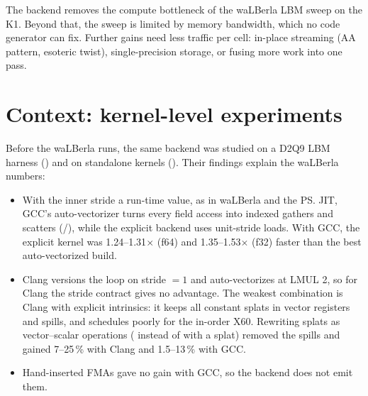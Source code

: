 \begin{keyidea}
  The backend removes the compute bottleneck of the waLBerla LBM sweep on the K1. Beyond
  that, the sweep is limited by memory bandwidth, which no code generator can fix.
  Further gains need less traffic per cell: in-place streaming (AA pattern, esoteric
  twist), single-precision storage, or fusing more work into one pass.
\end{keyidea}

\section{Context: kernel-level experiments}\label{r02:sec:results-context}

Before the waLBerla runs, the same backend was studied on a D2Q9 LBM harness
() and on standalone kernels
(). Their findings explain the waLBerla numbers:
\begin{itemize}
  \item With the inner stride a run-time value, as in waLBerla and the \ps{} JIT,
        GCC's auto-vectorizer turns every field access into indexed gathers and scatters
        (/), while the explicit backend uses unit-stride
        loads. With GCC, the explicit kernel was 1.24--1.31$\times$ (f64) and
        1.35--1.53$\times$ (f32) faster than the best auto-vectorized build.
  \item Clang versions the loop on stride $=1$ and auto-vectorizes at LMUL 2, so for
        Clang the stride contract gives no advantage. The weakest combination is Clang
        with explicit intrinsics: it keeps all constant splats in vector registers and
        spills, and schedules poorly for the in-order X60. Rewriting splats as
        vector--scalar  operations ( instead of
         with a  splat) removed the spills and gained 7--25\,\%
        with Clang and 1.5--13\,\% with GCC.
  \item Hand-inserted FMAs gave no gain with GCC, so the backend does not emit them.
\end{itemize}
